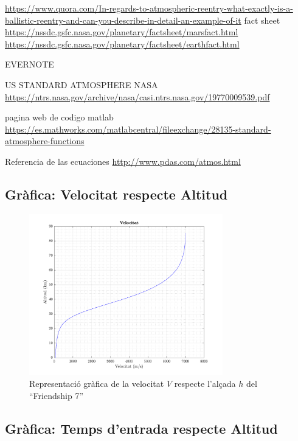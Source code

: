 {%
\url{https://www.quora.com/In-regards-to-atmospheric-reentry-what-exactly-is-a-ballistic-reentry-and-can-you-describe-in-detail-an-example-of-it}
fact sheet
\url{https://nssdc.gsfc.nasa.gov/planetary/factsheet/marsfact.html}
\url{https://nssdc.gsfc.nasa.gov/planetary/factsheet/earthfact.html}

EVERNOTE
\url{}

US STANDARD ATMOSPHERE NASA
\url{https://ntrs.nasa.gov/archive/nasa/casi.ntrs.nasa.gov/19770009539.pdf}


pagina web de codigo matlab
\url{https://es.mathworks.com/matlabcentral/fileexchange/28135-standard-atmosphere-functions}

Referencia de las ecuaciones
\url{http://www.pdas.com/atmos.html}
}








\newpage
\subsection{Gràfica: Velocitat respecte Altitud}

\begin{figure}[h]
    \centering
    \includegraphics[width=0.75\textwidth]{imagenes/09_mercury_graficas/velocitat.pdf}
    \caption{Representació gràfica de la velocitat $V$ respecte l'alçada $h$ del ``Friendship 7''}
    \label{fig:velocitat_merc}
\end{figure}


\newpage
\subsection{Gràfica: Temps d'entrada respecte Altitud}

